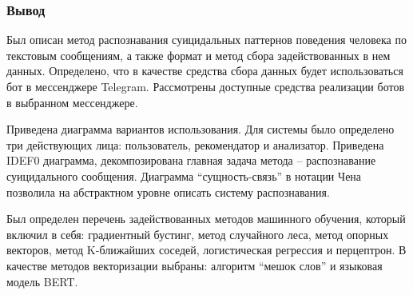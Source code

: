 \subsubsection*{Вывод}

Был описан метод распознавания суицидальных паттернов поведения человека по текстовым сообщениям, а также формат и метод сбора задействованных в нем данных. 
Определено, что в качестве средства сбора данных будет использоваться бот в мессенджере Telegram. Рассмотрены доступные средства реализации ботов в выбранном мессенджере.

Приведена диаграмма вариантов использования. Для системы было определено три действующих лица: пользователь, рекомендатор и анализатор. 
Приведена IDEF0 диаграмма, декомпозирована главная задача метода -- распознавание суицидального сообщения. 
Диаграмма ``сущность-связь'' в нотации Чена позволила на абстрактном уровне описать систему распознавания. 

Был определен перечень задействованных методов машинного обучения, который включил в себя: градиентный бустинг, метод случайного леса, метод опорных векторов, метод K-ближайших соседей, логистическая регрессия и перцептрон. В качестве методов векторизации выбраны: алгоритм ``мешок слов'' и языковая модель BERT.



\pagebreak